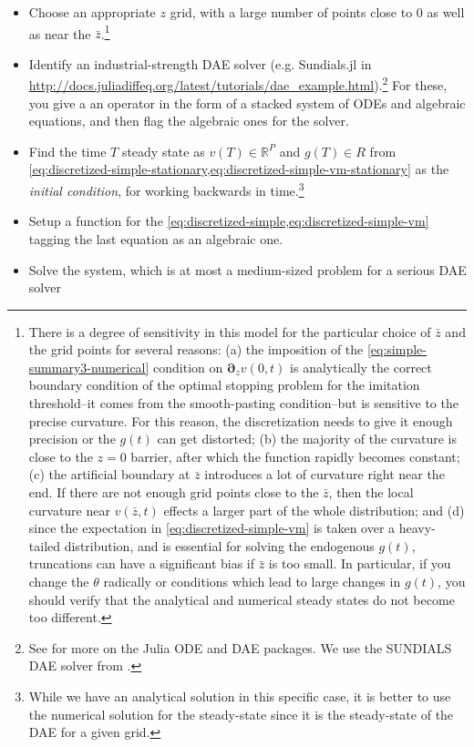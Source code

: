 \documentclass[11pt]{article}
\newcommand{\D}[1][]{\ensuremath{\boldsymbol{\partial}_{#1}}}
\newcommand{\R}{\ensuremath{\mathbb{R}}}
\begin{document}
\begin{itemize}
	\item Choose an appropriate $z$ grid, with a large number of points close to $0$ as well as near the $\bar{z}$.\footnote{There is a degree of sensitivity in this model for the particular choice of $\bar{z}$ and the grid points for several reasons: (a) the imposition of the \cref{eq:simple-summary3-numerical} condition on $\D[z]v(0,t)$  is analytically the correct boundary condition of the optimal stopping problem for the imitation threshold--it comes from the smooth-pasting condition--but is sensitive to the precise curvature.  For this reason, the discretization needs to give it enough precision or the $g(t)$ can get distorted; (b) the majority of the curvature is close to the $z=0$ barrier, after which the function rapidly becomes constant; (c) the artificial boundary at $\bar{z}$ introduces a lot of curvature right near the end.  If there are not enough grid points close to the $\bar{z}$, then the local curvature near $v(\bar{z},t)$ effects a larger part of the whole distribution; and (d) since the expectation in \cref{eq:discretized-simple-vm} is taken over a heavy-tailed distribution, and is essential for solving the endogenous $g(t)$, truncations can have a significant bias if $\bar{z}$ is too small.  In particular, if you change the $\theta$ radically or conditions which lead to large changes in $g(t)$, you should verify that the analytical and numerical steady states do not become too different.}
	\item Identify an industrial-strength DAE solver (e.g. Sundials.jl in \url{http://docs.juliadiffeq.org/latest/tutorials/dae_example.html}).\footnote{See \cite{RackauckasNie2017} for more on the Julia ODE and DAE packages.  We use the SUNDIALS DAE solver from \cite{HindmarshBrownGrantEtAl2005}.}  For these, you give a an operator in the form of a stacked system of ODEs and algebraic equations, and then flag the algebraic ones for the solver.
	\item Find the time $T$ steady state as $v(T) \in \R^P$ and $g(T) \in R$ from \cref{eq:discretized-simple-stationary,eq:discretized-simple-vm-stationary} as the \textit{initial condition}, for working backwards in time.\footnote{While we have an analytical solution in this specific case, it is better to use the numerical solution for the steady-state since it is the steady-state of the DAE for a given grid.}
	\item Setup a function for the \cref{eq:discretized-simple,eq:discretized-simple-vm} tagging the last equation as an algebraic one.
	\item Solve the system, which is at most a medium-sized problem for a serious DAE solver
\end{itemize}
\end{document}
